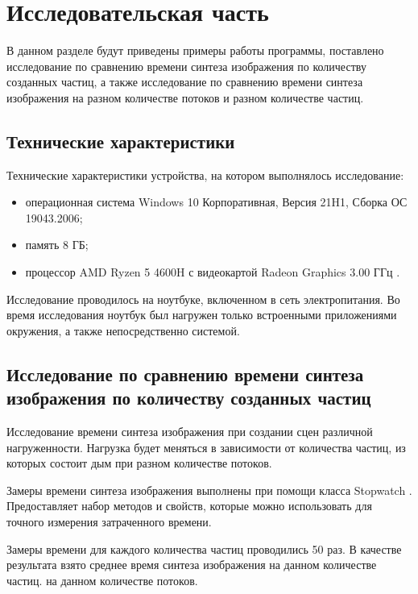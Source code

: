 \chapter{Исследовательская часть}

В данном разделе будут приведены примеры работы программы, поставлено исследование по сравнению времени синтеза изображения по количеству созданных частиц, а также исследование по сравнению времени синтеза изображения на разном количестве потоков и разном количестве частиц.

\section{Технические характеристики}

Технические характеристики устройства, на котором выполнялось исследование:

\begin{itemize}[label=---]
	\item операционная система Windows 10 Корпоративная, Версия	21H1, Сборка ОС 19043.2006;
	\item память 8 ГБ;
	\item процессор AMD Ryzen 5 4600H с видеокартой Radeon Graphics 3.00 ГГц \cite{processor}.
\end{itemize}

Исследование проводилось на ноутбуке, включенном в сеть электропитания. Во время исследования ноутбук был нагружен только встроенными приложениями окружения, а также непосредственно системой.

\section{Исследование по сравнению времени синтеза изображения по количеству созданных частиц}

Исследование времени синтеза изображения при создании сцен различной нагруженности. Нагрузка будет меняться в зависимости от количества частиц, из которых состоит дым при разном количестве потоков.

Замеры времени синтеза изображения выполнены при помощи класса Stopwatch \cite{csharplangtime}. Предоставляет набор методов и свойств, которые можно использовать для точного измерения затраченного времени.

Замеры времени для каждого количества частиц проводились 50 раз. В качестве результата взято среднее время синтеза изображения на данном количестве частиц. на данном количестве потоков.

